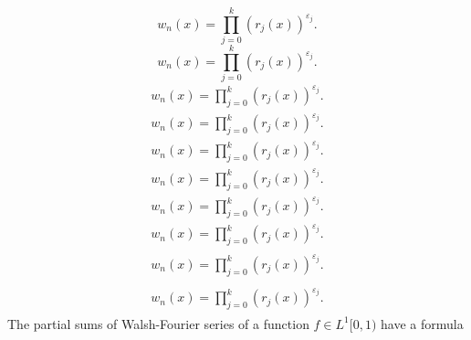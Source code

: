 \documentclass{amsart}
\numberwithin{equation}{section}
\begin{document}
{
\begin{equation*} 
w_n(x)=\prod_{j=0}^k(r_j(x))^{\varepsilon_j}.
 \end{equation*}\fi  
{}\begin{equation}
w_n(x)=\prod_{j=0}^k(r_j(x))^{\varepsilon_j}.
\end{equation}\fi   
{}\begin{align*}
w_n(x)=\prod_{j=0}^k(r_j(x))^{\varepsilon_j}.
\end{align*}\fi   
{}\begin{align}
w_n(x)=\prod_{j=0}^k(r_j(x))^{\varepsilon_j}.
\end{align}\fi    
{}\begin{gather*}
w_n(x)=\prod_{j=0}^k(r_j(x))^{\varepsilon_j}.
\end{gather*}\fi  
{}\begin{gather}
w_n(x)=\prod_{j=0}^k(r_j(x))^{\varepsilon_j}.
\end{gather}\fi   
{}\begin{multline*}
w_n(x)=\prod_{j=0}^k(r_j(x))^{\varepsilon_j}.
\end{multline*}\fi  
{}\begin{multline}
w_n(x)=\prod_{j=0}^k(r_j(x))^{\varepsilon_j}.
\end{multline}\fi  
{}\begin{multline*}\begin{split}
w_n(x)=\prod_{j=0}^k(r_j(x))^{\varepsilon_j}.
\end{split}\end{multline*}\fi
{}\begin{multline}\begin{split}
w_n(x)=\prod_{j=0}^k(r_j(x))^{\varepsilon_j}.
\end{split}\end{multline}\fi
}
The partial sums of Walsh-Fourier series of a function $f\in L^1[0,1)$ have a formula
\end{document}
